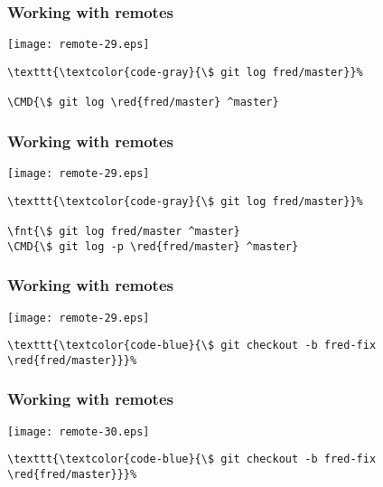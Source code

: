 \documentclass[english]{beamer}
\newcommand{\CMD}[1]{%
\texttt{\textcolor{code-blue}{#1}}%
}
\newcommand{\fnt}[1]{%
\texttt{\textcolor{code-gray}{#1}}%
}
\newcommand{\red}[1]{%
\textcolor{code-red}{#1}%
}
\begin{document}
\begin{frame}[fragile]
\frametitle{Working with remotes}

\texttt{[image: remote-29.eps]}

\begin{Verbatim}[commandchars=\\\{\}]
\fnt{\$ git log fred/master}
\CMD{\$ git log \red{fred/master} ^master}
\end{Verbatim}

\vspace{\textheight}
\end{frame}

\begin{frame}[fragile]
\frametitle{Working with remotes}

\texttt{[image: remote-29.eps]}

\begin{Verbatim}[commandchars=\\\{\}]
\fnt{\$ git log fred/master}
\fnt{\$ git log fred/master ^master}
\CMD{\$ git log -p \red{fred/master} ^master}
\end{Verbatim}

\vspace{\textheight}
\end{frame}

\begin{frame}[fragile]
\frametitle{Working with remotes}

\texttt{[image: remote-29.eps]}

\begin{Verbatim}[commandchars=\\\{\}]
\CMD{\$ git checkout -b fred-fix \red{fred/master}}
\end{Verbatim}

\vspace{\textheight}
\end{frame}

\begin{frame}[fragile]
\frametitle{Working with remotes}

\texttt{[image: remote-30.eps]}

\begin{Verbatim}[commandchars=\\\{\}]
\CMD{\$ git checkout -b fred-fix \red{fred/master}}
\end{Verbatim}

\vspace{\textheight}
\end{frame}
\end{document}

